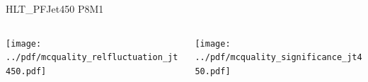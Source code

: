 \documentclass[9pt]{beamer}
\begin{document}
\begin{frame}[t]{HLT\_PFJet450 P8M1}
\begin{columns}[T]
  \begin{column}{.5\textwidth}
  \texttt{[image: ../pdf/mcquality\_relfluctuation\_jt450.pdf]}
  \end{column}
  \begin{column}{.5\textwidth}
  \texttt{[image: ../pdf/mcquality\_significance\_jt450.pdf]}
  \end{column}
\end{columns}
\end{frame}


%
%
\end{document}
